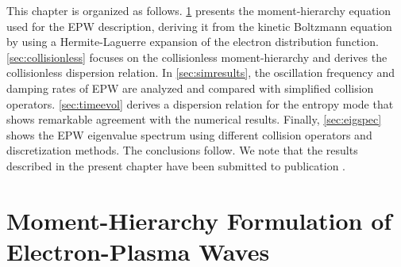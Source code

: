 This chapter is organized as follows.
%
\cref{sec:momhierarchy} presents the moment-hierarchy equation used for the EPW description, deriving it from the kinetic Boltzmann equation by using a Hermite-Laguerre expansion of the electron distribution function.
%
\cref{sec:collisionless} focuses on the collisionless moment-hierarchy and derives the collisionless dispersion relation.
%
In \cref{sec:simresults}, the oscillation frequency and damping rates of EPW are analyzed and compared with simplified collision operators.
%
\cref{sec:timeevol} derives a dispersion relation for the entropy mode that shows remarkable agreement with the numerical results.
%
Finally, \cref{sec:eigspec} shows the EPW eigenvalue spectrum using different collision operators and discretization methods.
%
The conclusions follow.
%
We note that the results described in the present chapter have been submitted to publication \citep{Jorge2018a}.

\section{Moment-Hierarchy Formulation of Electron-Plasma Waves}
\label{sec:momhierarchy}

